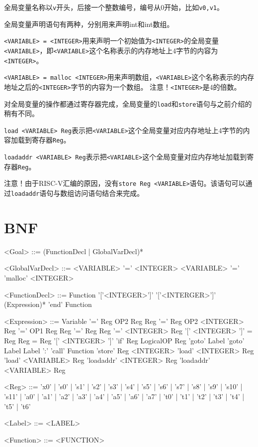 \documentclass{ctexart}
\newenvironment{typewriterfont}{\ttfamily}{\par}
\begin{document}
全局变量名称以\texttt{v}开头，后接一个整数编号，编号从0开始，比如\texttt{v0,v1}。

全局变量声明语句有两种，分别用来声明int和int数组。

\texttt{<VARIABLE> = <INTEGER>}用来声明一个初始值为\texttt{<INTEGER>}的全局变量\texttt{<VARIABLE>}，即\texttt{<VARIABLE>}这个名称表示的内存地址上4字节的内容为\texttt{<INTEGER>}。

\texttt{<VARIABLE> = malloc <INTEGER>}用来声明数组，\texttt{<VARIABLE>}这个名称表示的内存地址之后的\texttt{<INTEGER>}字节的内容为一个数组。
注意！\texttt{<INTEGER>}是4的倍数。

对全局变量的操作都通过寄存器完成，全局变量的\texttt{load}和\texttt{store}语句与之前介绍的稍有不同。

\texttt{load <VARIABLE> Reg}表示把\texttt{<VARIABLE>}这个全局变量对应内存地址上4字节的内容加载到寄存器\texttt{Reg}。

\texttt{loadaddr <VARIABLE> Reg}表示把\texttt{<VARIABLE>}这个全局变量对应内存地址加载到寄存器\texttt{Reg}。

注意！由于RISC-V汇编的原因，没有\texttt{store Reg <VARIABLE>}语句。该语句可以通过\texttt{loadaddr}语句与数组访问语句结合来完成。

\newpage
\section{BNF}
\setlength{\grammarindent}{8em} %
\begin{typewriterfont}
\begin{grammar}
<Goal>  ::= (FunctionDecl | GlobalVarDecl)*

<GlobalVarDecl> ::= <VARIABLE> '=' <INTEGER>
\alt <VARIABLE> '=' 'malloc' <INTEGER>

<FunctionDecl> ::= Function '['<INTEGER>']' '['<INTERGER>']' (Expression)* 'end' Function

<Expression>	::=	Variable '=' Reg OP2 Reg
\alt Reg '=' Reg OP2 <INTEGER>
\alt Reg '=' OP1 Reg
\alt Reg '=' Reg
\alt Reg '=' <INTEGER>
\alt Reg '[' <INTEGER> ']' = Reg
\alt Reg = Reg '[' <INTEGER> ']'
\alt 'if' Reg LogicalOP Reg 'goto' Label
\alt 'goto' Label
\alt Label ':'
\alt 'call' Function
\alt 'store' Reg <INTEGER>
\alt 'load' <INTEGER> Reg
\alt 'load' <VARIABLE> Reg
\alt 'loadaddr' <INTEGER> Reg
\alt 'loadaddr' <VARIABLE> Reg

<Reg> ::= 'x0'
| 's0'
| 's1'
| 's2'
| 's3'
| 's4'
| 's5'
| 's6'
| 's7'
| 's8'
| 's9'
| 's10'
| 's11'
| 'a0'
| 'a1'
| 'a2'
| 'a3'
| 'a4'
| 'a5'
| 'a6'
| 'a7'
| 't0'
| 't1'
| 't2'
| 't3'
| 't4'
| 't5'
| 't6'

<Label> ::= <LABEL>

<Function> ::= <FUNCTION>

\end{grammar}
\end{typewriterfont}
\end{document}
